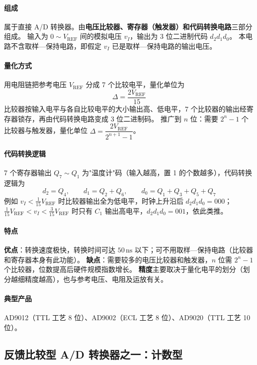 \paragraph{组成}
属于直接 A/D 转换器。由\textbf{电压比较器、寄存器（触发器）和代码转换电路}三部分组成。
输入为 $0\sim V_\text{REF}$ 间的模拟电压 $v_I$，输出为 3 位二进制代码 $d_2d_1d_0$。
本电路不含取样—保持电路，即假定 $v_I$ 已是取样—保持电路的输出电压。

\paragraph{量化方式}
用电阻链把参考电压 $V_\text{REF}$ 分成 7 个比较电平，量化单位为
\[
\Delta=\frac{2V_\text{REF}}{15}
\]
比较器按输入电平与各自比较电平的大小输出高、低电平，7 个比较器的输出经寄存器锁存，再由代码转换电路变成 3 位二进制码。
推广到 $n$ 位：需要 $2^n-1$ 个比较器与触发器，量化单位 $\Delta=\dfrac{2V_\text{REF}}{2^{n+1}-1}$。

\paragraph{代码转换逻辑}
7 个寄存器输出 $Q_7\sim Q_1$ 为"温度计"码（输入越高，置 1 的个数越多），代码转换逻辑为
\[
d_2=Q_4,\qquad d_1=Q_2+Q_6,\qquad d_0=Q_1+Q_3+Q_5+Q_7
\]
例如 $v_I<\frac{1}{15}V_\text{REF}$ 时比较器输出全为低电平，时钟上升沿后 $d_2d_1d_0=000$；
$\frac{1}{15}V_\text{REF}<v_I<\frac{3}{15}V_\text{REF}$ 时只有 $C_1$ 输出高电平，$d_2d_1d_0=001$，依此类推。

\paragraph{特点}
\textbf{优点}：转换速度极快，转换时间可达 $50\,\mathrm{ns}$ 以下；可不用取样—保持电路（比较器和寄存器本身有此功能）。
\textbf{缺点}：需要较多的电压比较器和触发器，$n$ 位需 $2^n-1$ 个比较器，位数提高后硬件规模指数增长。
\textbf{精度}主要取决于量化电平的划分（划分越细精度越高），也与参考电压、电阻及运放有关。

\paragraph{典型产品}
AD9012（TTL 工艺 8 位）、AD9002（ECL 工艺 8 位）、AD9020（TTL 工艺 10 位）。

\subsection{反馈比较型 A/D 转换器之一：计数型}
